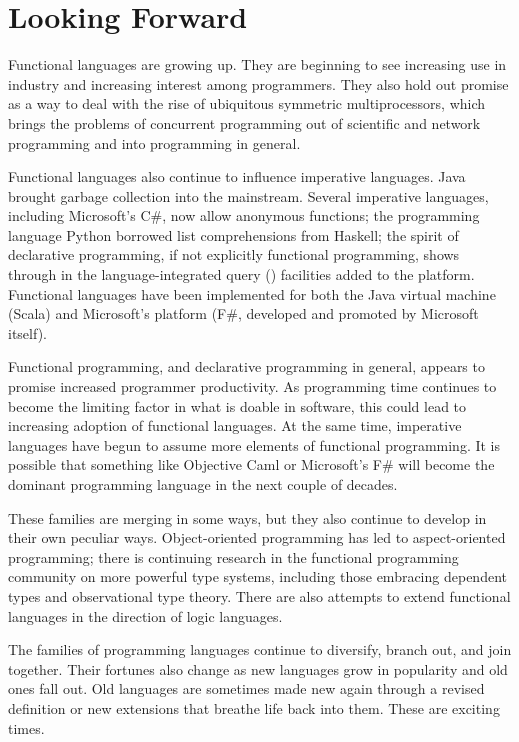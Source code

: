 \section*{Looking Forward}\label{conclusion:forward}
Functional languages are growing up. They are beginning to see increasing use in industry and increasing interest among programmers. They also hold out promise as a way to deal with the rise of ubiquitous symmetric multiprocessors, which brings the problems of concurrent programming out of scientific and network programming and into programming in general.

Functional languages also continue to influence imperative languages. Java brought garbage collection into the mainstream. Several imperative languages, including Microsoft's C\#, now allow anonymous functions; the programming language Python borrowed list comprehensions from Haskell; the spirit of declarative programming, if not explicitly functional programming, shows through in the language-integrated query () facilities added to the  platform. Functional languages have been implemented for both the Java virtual machine (Scala) and Microsoft's  platform (F\#, developed and promoted by Microsoft itself).

Functional programming, and declarative programming in general, appears to promise increased programmer productivity. As programming time continues to become the limiting factor in what is doable in software, this could lead to increasing adoption of functional languages. At the same time, imperative languages have begun to assume more elements of functional programming. It is possible that something like Objective Caml or Microsoft's F\# will become the dominant programming language in the next couple of decades.

These families are merging in some ways, but they also continue to develop in their own peculiar ways. Object-oriented programming has led to aspect-oriented programming; there is continuing research in the functional programming community on more powerful type systems, including those embracing dependent types and observational type theory. There are also attempts to extend functional languages in the direction of logic languages.

The families of programming languages continue to diversify, branch out, and join together. Their fortunes also change as new languages grow in popularity and old ones fall out. Old languages are sometimes made new again through a revised definition or new extensions that breathe life back into them. These are exciting times.